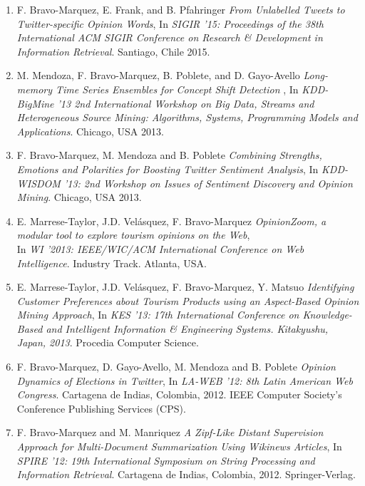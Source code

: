 \documentclass[letterpaper]{article}
\begin{document}
\begin{enumerate}
\item F. Bravo-Marquez, E. Frank, and B. Pfahringer \textit{From Unlabelled Tweets to Twitter-specific Opinion Words}, In \textit{SIGIR '15: Proceedings of the 38th International ACM SIGIR Conference on Research \& Development in Information Retrieval}. Santiago, Chile 2015. 

\item M. Mendoza, F. Bravo-Marquez, B. Poblete, and D. Gayo-Avello \textit{Long-memory Time Series Ensembles for Concept Shift Detection} , In \textit{KDD-BigMine '13 2nd International Workshop on Big Data, Streams and Heterogeneous Source Mining: Algorithms, Systems, Programming Models and Applications}. Chicago, USA 2013.

\item F. Bravo-Marquez, M. Mendoza and B. Poblete \textit{Combining Strengths, Emotions and Polarities for Boosting Twitter Sentiment Analysis}, In \textit{KDD-WISDOM '13: 2nd Workshop on Issues of Sentiment Discovery and Opinion Mining}. Chicago, USA 2013. 

\item E. Marrese-Taylor, J.D. Velásquez, F. Bravo-Marquez \textit{OpinionZoom, a modular tool to explore tourism opinions on the Web}, \\
In \textit{WI '2013: IEEE/WIC/ACM International Conference on Web Intelligence}. Industry Track. Atlanta, USA. 

\item E. Marrese-Taylor, J.D. Velásquez, F. Bravo-Marquez, Y. Matsuo \textit{Identifying Customer Preferences about Tourism Products using an Aspect-Based Opinion Mining Approach}, In \textit{KES '13: 17th International Conference on Knowledge-Based and Intelligent Information \& Engineering Systems. Kitakyushu, Japan, 2013}. Procedia Computer Science. 

\item F. Bravo-Marquez, D. Gayo-Avello, M. Mendoza and B. Poblete \textit{Opinion Dynamics of Elections in Twitter}, In \textit{LA-WEB '12: 8th Latin American Web Congress}. Cartagena de Indias, Colombia, 2012. IEEE Computer Society's Conference Publishing Services (CPS).

\item F. Bravo-Marquez and M. Manriquez \textit{A Zipf-Like Distant Supervision Approach for Multi-Document Summarization Using Wikinews Articles}, In \textit{SPIRE '12: 19th International Symposium on String Processing and Information Retrieval}. Cartagena de Indias, Colombia, 2012. Springer-Verlag.


\end{enumerate}
\end{document}
